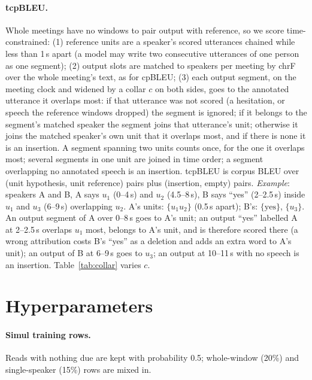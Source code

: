 \paragraph{tcpBLEU.} Whole meetings have no windows to pair output with reference, so we score time-constrained:
(1) reference units are a speaker's scored utterances chained while less than 1\,s apart (a model may write two
consecutive utterances of one person as one segment); (2) output slots are matched to speakers per meeting by chrF over
the whole meeting's text, as for cpBLEU; (3) each output segment, on the meeting clock and widened by a collar $c$ on both
sides, goes to the annotated utterance it overlaps most: if that utterance was not scored (a hesitation, or speech the
reference windows dropped) the segment is ignored; if it belongs to the segment's matched speaker the segment joins that
utterance's unit; otherwise it joins the matched speaker's own unit that it overlaps most, and if there is none it is an
insertion. A segment spanning two units counts once, for the one it overlaps most; several segments in one unit are
joined in time order; a segment overlapping no annotated speech is an insertion. tcpBLEU is corpus BLEU over
(unit hypothesis, unit reference) pairs plus (insertion, empty) pairs. \emph{Example}: speakers A and B, A says $u_1$
(0--4\,s) and $u_2$ (4.5--8\,s), B says ``yes'' (2--2.5\,s) inside $u_1$ and $u_3$ (6--9\,s) overlapping $u_2$. A's units:
$\{u_1u_2\}$ (0.5\,s apart); B's: $\{\text{yes}\}$, $\{u_3\}$. An output segment of A over 0--8\,s goes to A's unit; an
output ``yes'' labelled A at 2--2.5\,s overlaps $u_1$ most, belongs to A's unit, and is therefore scored there (a wrong
attribution costs B's ``yes'' as a deletion and adds an extra word to A's unit); an output of B at 6--9\,s goes to
$u_3$; an output at 10--11\,s with no speech is an insertion. Table~\ref{tab:collar} varies $c$.



\section{Hyperparameters}
\label{app:hyper}

\paragraph{Simul training rows.} Reads with nothing due are kept with probability 0.5; whole-window (20\%) and
single-speaker (15\%) rows are mixed in.

